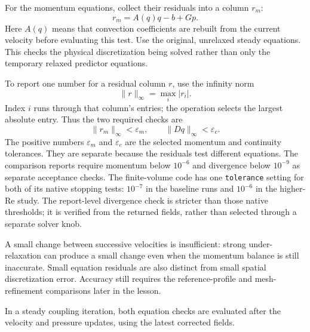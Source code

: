 For the momentum equations, collect their residuals into a column $r_m$:
\[
r_m=A(q)q-b+Gp.
\]
Here $A(q)$ means that convection coefficients are rebuilt from the current
velocity before evaluating this test. Use the original, unrelaxed steady
equations. This checks the physical discretization being solved rather than
only the temporary relaxed predictor equations.

To report one number for a residual column $r$, use the infinity norm
\[
\|r\|_\infty=\max_i|r_i|.
\]
Index $i$ runs through that column's entries; the operation selects the
largest absolute entry. Thus the two required checks are
\[
\|r_m\|_\infty<\varepsilon_m,\qquad
\|Dq\|_\infty<\varepsilon_c.
\]
The positive numbers $\varepsilon_m$ and $\varepsilon_c$ are the selected
momentum and continuity tolerances. They are separate because the residuals
test different equations. The comparison reports require momentum below $10^{-6}$ and divergence below
$10^{-9}$ as separate acceptance checks. The finite-volume code has one
\texttt{tolerance} setting for both of its native stopping tests: $10^{-7}$
in the baseline runs and $10^{-6}$ in the higher-Re study. The report-level
divergence check is stricter than those native thresholds; it is verified
from the returned fields, rather than selected through a separate solver knob.

A small change between successive velocities is insufficient: strong
under-relaxation can produce a small change even when the momentum balance
is still inaccurate. Small equation residuals are also distinct from small
spatial discretization error. Accuracy still requires the reference-profile
and mesh-refinement comparisons later in the lesson.

In a steady coupling iteration, both equation checks are evaluated after
the velocity and pressure updates, using the latest corrected fields.
